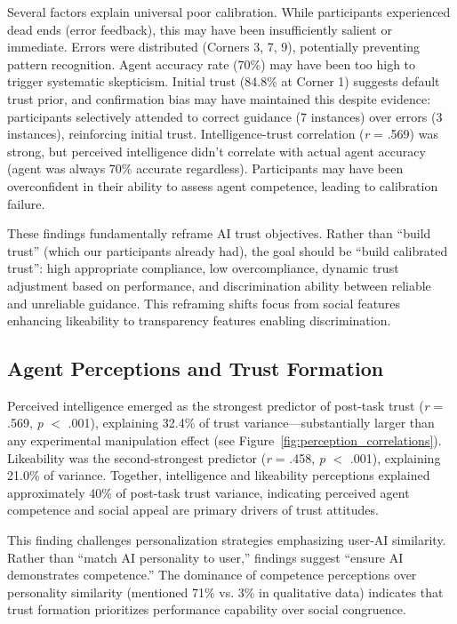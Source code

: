 \documentclass[12pt]{article}
\begin{document}
Several factors explain universal poor calibration. While participants experienced dead ends (error feedback), this may have been insufficiently salient or immediate. Errors were distributed (Corners 3, 7, 9), potentially preventing pattern recognition. Agent accuracy rate (70\%) may have been too high to trigger systematic skepticism. Initial trust (84.8\% at Corner 1) suggests default trust prior, and confirmation bias may have maintained this despite evidence: participants selectively attended to correct guidance (7 instances) over errors (3 instances), reinforcing initial trust. Intelligence-trust correlation (\textit{r} = .569) was strong, but perceived intelligence didn't correlate with actual agent accuracy (agent was always 70\% accurate regardless). Participants may have been overconfident in their ability to assess agent competence, leading to calibration failure.

These findings fundamentally reframe AI trust objectives. Rather than ``build trust'' (which our participants already had), the goal should be ``build calibrated trust'': high appropriate compliance, low overcompliance, dynamic trust adjustment based on performance, and discrimination ability between reliable and unreliable guidance. This reframing shifts focus from social features enhancing likeability to transparency features enabling discrimination.

\subsection{Agent Perceptions and Trust Formation}

Perceived intelligence emerged as the strongest predictor of post-task trust (\textit{r} = .569, \textit{p} $<$ .001), explaining 32.4\% of trust variance—substantially larger than any experimental manipulation effect (see Figure~\ref{fig:perception_correlations}). Likeability was the second-strongest predictor (\textit{r} = .458, \textit{p} $<$ .001), explaining 21.0\% of variance. Together, intelligence and likeability perceptions explained approximately 40\% of post-task trust variance, indicating perceived agent competence and social appeal are primary drivers of trust attitudes.

This finding challenges personalization strategies emphasizing user-AI similarity. Rather than ``match AI personality to user,'' findings suggest ``ensure AI demonstrates competence.'' The dominance of competence perceptions over personality similarity (mentioned 71\% vs. 3\% in qualitative data) indicates that trust formation prioritizes performance capability over social congruence.
\end{document}
